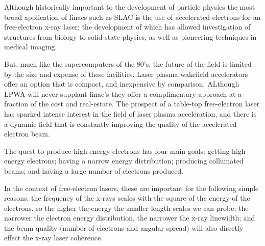 \documentclass[12pt,letter]{article}
\begin{document}
 Although historically important to the development of particle
 physics the most broad application of linacs such as SLAC is the use of
 accelerated electrons for an free-electron x-ray laser; the development of
 which has allowed investigation of structures from biology to solid state
 physics, as well as pioneering techniques in medical imaging.\cite{o2001free}
 

 But, much like the supercomputers of the 80's, the future of the field is limited by the size and expense of these
 facilities. Laser plasma
 wakefield accelerators offer an option that is compact, and inexpensive by
 comparison. ALthough LPWA will never supplant linac's they offer a complimentary approach at a
 fraction of the cost and real-estate. The prospect of a table-top free-electron
 laser has sparked intense interest in the field of laser plasma acceleration,
 and there is a dynamic field that is constantly improving the quality of the
 accelerated electron beam.


 The quest to produce high-energy electrons has four main goals: getting
  high-energy electrons; having a narrow energy distribution; producing collumated beams; and having a large number of electrons
 produced.

 In the context of free-electron lasers, these are important for the following
 simple reasons: the frequency of the x-rays scales with the square of the
 energy of the electrons, so the higher the energy the smaller length scales we
 can probe; the narrower the electron energy distribution, the narrower the
 x-ray linewidth; and the beam quality (number of electrons and angular spread)
 will also directly effect the x-ray laser coherence.
\end{document}
